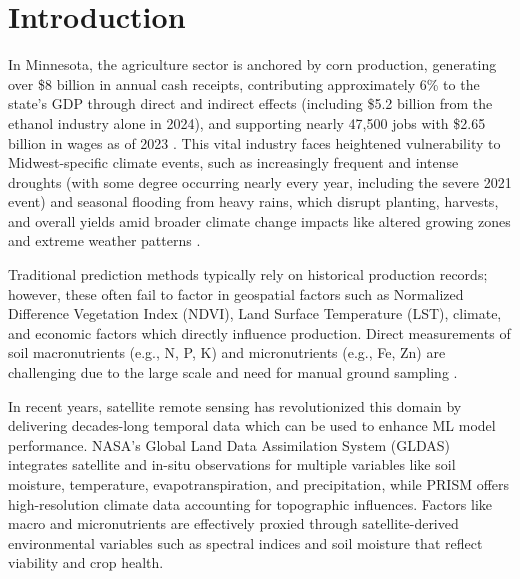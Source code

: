 \documentclass[twocolumn]{article}
\begin{document}
\section{Introduction}

In Minnesota, the agriculture sector is anchored by corn production, generating over \$8 billion in annual cash receipts, contributing approximately 6\% to the state's GDP through direct and indirect effects (including \$5.2 billion from the ethanol industry alone in 2024), and supporting nearly 47,500 jobs with \$2.65 billion in wages as of 2023 \cite{usda_ers}. This vital industry faces heightened vulnerability to Midwest-specific climate events, such as increasingly frequent and intense droughts (with some degree occurring nearly every year, including the severe 2021 event) and seasonal flooding from heavy rains, which disrupt planting, harvests, and overall yields amid broader climate change impacts like altered growing zones and extreme weather patterns \cite{rodell2004}.

Traditional prediction methods typically rely on historical production records; however, these often fail to factor in geospatial factors such as Normalized Difference Vegetation Index (NDVI), Land Surface Temperature (LST), climate, and economic factors which directly influence production. Direct measurements of soil macronutrients (e.g., N, P, K) and micronutrients (e.g., Fe, Zn) are challenging due to the large scale and need for manual ground sampling \cite{kayad2019, ji2022}.

In recent years, satellite remote sensing has revolutionized this domain by delivering decades-long temporal data which can be used to enhance ML model performance. NASA's Global Land Data Assimilation System (GLDAS) integrates satellite and in-situ observations for multiple variables like soil moisture, temperature, evapotranspiration, and precipitation, while PRISM offers high-resolution climate data accounting for topographic influences. Factors like macro and micronutrients are effectively proxied through satellite-derived environmental variables such as spectral indices and soil moisture that reflect viability and crop health.
\end{document}
